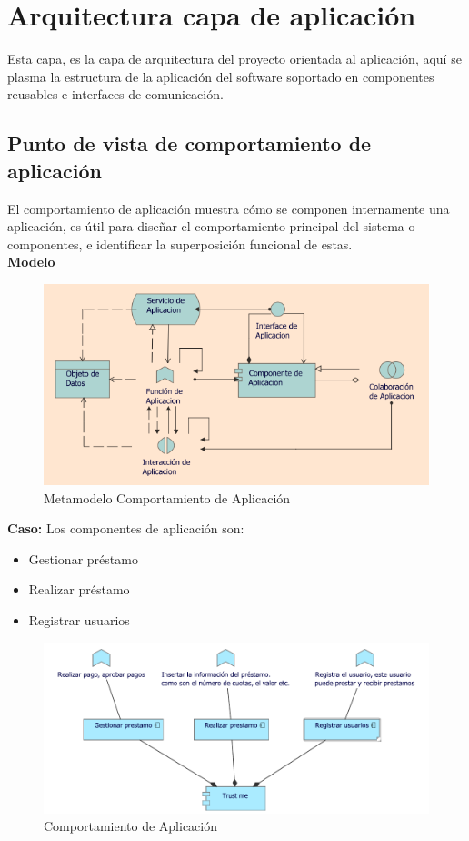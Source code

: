 \section{Arquitectura capa de aplicación}
{Esta capa, es la capa de arquitectura del proyecto orientada al aplicación, aquí se plasma la estructura de la aplicación del software soportado en componentes reusables e interfaces de comunicación.}

	\subsection{Punto de vista de comportamiento de aplicación}
	{ El comportamiento de aplicación muestra cómo se componen internamente una aplicación, es útil para diseñar el comportamiento principal del sistema o componentes, e identificar la superposición funcional de estas.\\
		
		\textbf{Modelo}\\
		\begin{figure}[H]
			\centering
			\includegraphics[width=0.8\linewidth]{development/comportamientoapp.png}
			\caption{Metamodelo Comportamiento de Aplicación}
		\end{figure}
	
		\textbf{Caso:} Los componentes de aplicación son:
		
		\begin{itemize}
			\item Gestionar préstamo
			\item Realizar préstamo
			\item Registrar usuarios
		\end{itemize}
		
		\begin{figure}[H]
			\centering
			\includegraphics[width=0.6\linewidth]{development/comportamientoapp.pdf}
			\caption{Comportamiento de Aplicación}
		\end{figure}
	}
	

